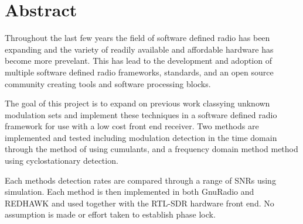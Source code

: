 \chapter{Abstract}

Throughout the last few years the field of software defined radio has been
expanding and the variety of readily available and affordable hardware has
become more prevelant.  This has lead to the development and adoption of
multiple software defined radio frameworks, standards, and an open source
community creating tools and software processing blocks.  

The goal of this project is to expand on previous work classying unknown
modulation sets and implement these techniques in a software defined radio
framework for use with a low cost front end receiver.  Two methods are
implemented and tested including modulation detection in the time domain through
the method of using cumulants, and a frequency domain method method using
cyclostationary detection.

Each methods detection rates are compared through a range of SNRs using
simulation.  Each method is then implemented in both GnuRadio and REDHAWK and
used together with the RTL-SDR hardware front end.  No assumption is made or
effort taken to establish phase lock.
